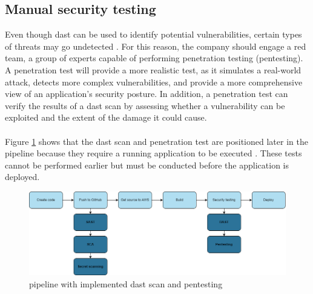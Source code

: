 \subsection{Manual security testing}
Even though \acrshort{dast} can be used to identify potential vulnerabilities, certain types of threats may go undetected \cite{dastpentesting}. For this reason, the company should engage a red team, a group of experts capable of performing penetration testing (pentesting). A penetration test will provide a more realistic test, as it simulates a real-world attack, detects more complex vulnerabilities, and provide a more comprehensive view of an application's security posture. In addition, a penetration test can verify the results of a  \acrshort{dast} scan by assessing whether a vulnerability can be exploited and the extent of the damage it could cause. 
\\~\\
Figure \ref{fig: Pipeline with implemented DAST scan and pentesting} shows that the \acrshort{dast} scan and penetration test are positioned later in the \gls{pipeline} because they require a running application to be executed \cite{dastplacment}. These tests cannot be performed earlier but must be conducted before the application is deployed.
\vspace{2mm}

\begin{figure}[H]
    \centering
    \includegraphics[width=0.8\columnwidth]{Images/pipeline5.png}
    \caption{\gls{pipeline} with implemented \acrshort{dast} scan and pentesting}
    \label{fig: Pipeline with implemented DAST scan and pentesting}
\end{figure}
